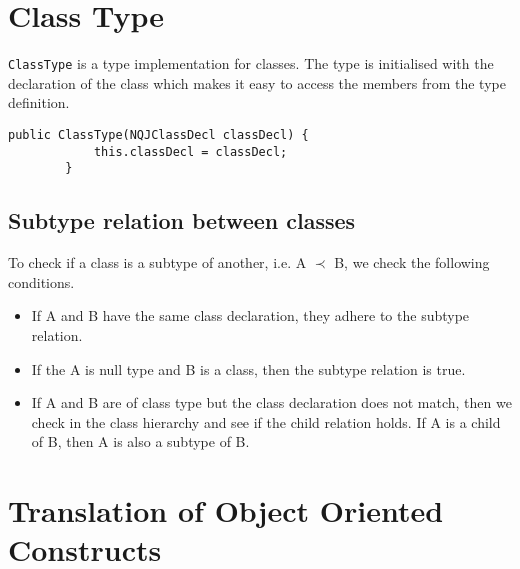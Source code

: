 \documentclass[]{tukportfolio}
\begin{document}
\section{Class Type}\label{ClassType}

\lstinline|ClassType| is a type implementation for classes. The type is initialised with the declaration of the class which makes it easy to access the members from the type definition.
\begin{lstlisting}[caption={Constructor for the \lstinline|ClassType|},captionpos=b,label={classTypeConstructor}]
		public ClassType(NQJClassDecl classDecl) {
			this.classDecl = classDecl;
		}
\end{lstlisting}
\subsection{Subtype relation between classes}
To check if a class is a subtype of another, i.e. A $\prec$ B, we check the following conditions.
\begin{itemize}
	\item If A and B have the same class declaration, they adhere to the subtype relation.
	\item If the A is null type and B is a class, then the subtype relation is true.
	\item If A and B are of class type but the class declaration does not match, then we check in the class hierarchy and see if the child relation holds. If A is a child of B, then A is also a subtype of B.
\end{itemize}


\section{Translation of Object Oriented Constructs}
\end{document}
